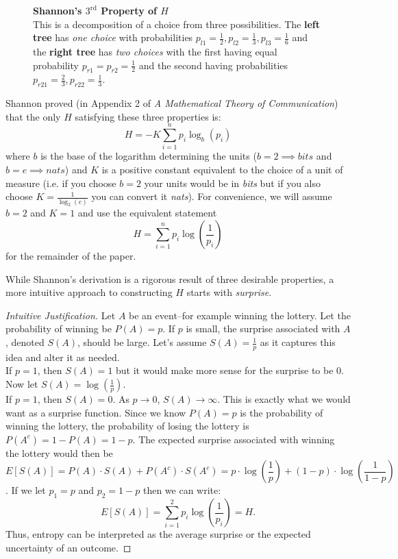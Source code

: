 \documentclass{article}\usepackage[]{graphicx}\usepackage[]{color}
\begin{document}
\begin{enumerate}
\begin{figure}
\begin{tikzpicture}[
  grow=right,
  thick,
  level 1/.style={sibling distance=15mm},
  level 2/.style={sibling distance=10mm}
]
\end{tikzpicture}
\caption{{\bf Shannon's $3^{\text{rd}}$ Property of $H$} \\
    This is a decomposition of a choice from three possibilities. The {\bf left tree} has \textit{one choice} with probabilities $p_{l1}=\frac{1}{2}, p_{l2}=\frac{1}{3}, p_{l3}=\frac{1}{6}$ and the {\bf right tree} has \textit{two choices} with the first having equal probability $p_{r1}=p_{r2}=\frac{1}{2}$ and the second having probabilities $p_{r21}=\frac{2}{3},p_{r22}=\frac{1}{3}$\cite{shannonMathematicalTheoryCommunication}.}
    \label{fig:entropy}
\end{figure}
\end{enumerate}

Shannon proved (in Appendix 2 of \textit{A Mathematical Theory of Communication}\cite{shannonMathematicalTheoryCommunication}) that the only $H$ satisfying these three properties is:
$$H = -K\sum_{i=1}^np_i\log_b(p_i)$$
where $b$ is the base of the logarithm determining the units ($b=2 \implies bits$ and $b=e \implies nats$) and $K$ is a positive constant equivalent to the choice of a unit of measure (i.e. if you choose $b=2$ your units would be in \textit{bits} but if you also choose $K = \frac{1}{\log_2(e)}$ you can convert it \textit{nats}). For convenience, we will assume $b=2$ and $K=1$ and use the equivalent statement 
\begin{equation}
H = \sum_{i=1}^np_i\log(\frac{1}{p_i})
\label{eq:entropy}
\end{equation}
for the remainder of the paper. 
\par
While Shannon's derivation is a rigorous result of three desirable properties, a more intuitive approach to constructing $H$ starts with \textit{surprise}\cite{ngProbabilitySurprisesEntropy2022,saraivaShannonEntropyIts2023}.
\begin{proof}[Intuitive Justification]
Let $A$ be an event--for example winning the lottery. Let the probability of winning be $P(A)=p$. If $p$ is small, the surprise associated with $A$, denoted $S(A)$, should be large. Let's assume $S(A) = \frac{1}{p}$ as it captures this idea and alter it as needed. \\
If $p=1$, then $S(A) = 1$ but it would make more sense for the surprise to be $0$. Now let $S(A) = \log(\frac{1}{p})$. \\
If $p=1$, then $S(A) = 0$. As $p\to 0$, $S(A) \to \infty$. This is exactly what we would want as a surprise function. Since we know $P(A) = p$ is the probability of winning the lottery, the probability of losing the lottery is $P(A^c) = 1-P(A) = 1-p$. The expected surprise associated with winning the lottery would then be 
$$E[S(A)] = P(A)\cdot S(A) + P(A^c) \cdot S(A^c) = p\cdot \log(\frac{1}{p}) + (1-p)\cdot \log(\frac{1}{1-p})$$.
If we let $p_1 = p$ and $p_2 = 1-p$ then we can write: 
$$E[S(A)] = \sum\limits_{i=1}^2 p_i \log(\frac{1}{p_i}) = H.$$
Thus, entropy can be interpreted as the average surprise or the expected uncertainty of an outcome.
\end{proof}
\end{document}
